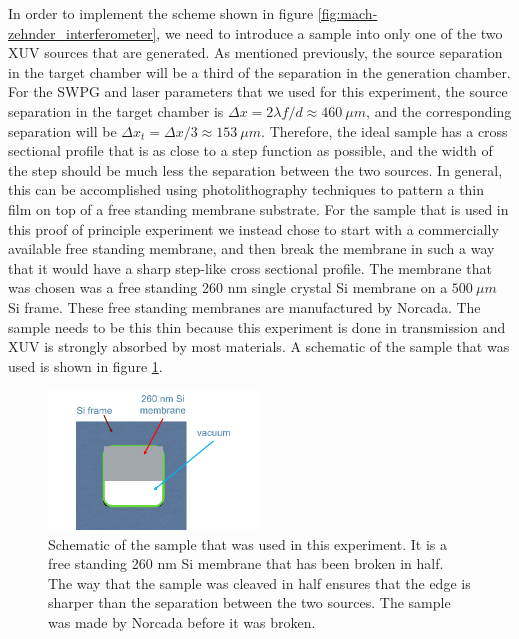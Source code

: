 In order to implement the scheme shown in figure \ref{fig:mach-zehnder_interferometer}, we need to introduce a sample into only one of the two XUV sources that are generated.  As mentioned previously, the source separation in the target chamber will be a third of the separation in the generation chamber. For the SWPG and laser parameters that we used for this experiment, the source separation in the target chamber is $\Delta x=2\lambda f/d\approx460\:\mu m$, and the corresponding separation will be $\Delta x_t = \Delta x/3\approx153\: \mu m$.  Therefore, the ideal sample has a cross sectional profile that is as close to a step function as possible, and the width of the step should be much less the separation between the two sources.  In general, this can be accomplished using photolithography techniques to pattern a thin film on top of a free standing membrane substrate.  For the sample that is used in this proof of principle experiment we instead chose to start with a commercially available free standing membrane, and then break the membrane in such a way that it would have a sharp step-like cross sectional profile.  The membrane that was chosen was a free standing 260 nm single crystal Si membrane on a $500\:\mu m$ Si frame.  These free standing membranes are manufactured by Norcada.  The sample needs to be this thin because this experiment is done in transmission and XUV is strongly absorbed by most materials. A schematic of the sample that was used is shown in figure \ref{fig:split_sample}.
\begin{figure}
	\centering
	\includegraphics[width=0.5\textwidth]{figures/refractive_index/broken_sample.png}
	\caption{Schematic of the sample that was used in this experiment.  It is a free standing 260 nm Si membrane that has been broken in half.  The way that the sample was cleaved in half ensures that the edge is sharper than the separation between the two sources.  The sample was made by Norcada before it was broken.}
	\label{fig:split_sample}
\end{figure}

